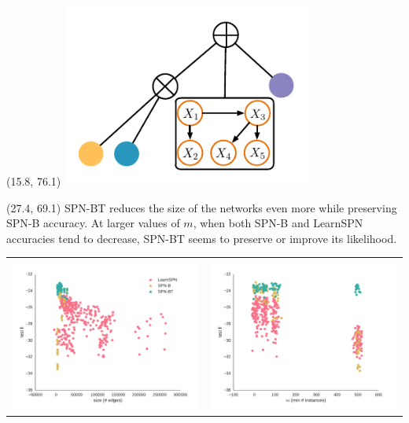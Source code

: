\documentclass[final]{beamer}
\begin{document}
\begin{frame}{}
  \begin{textblock}{10}(15.8, 76.1)
    \includegraphics[width=8.2cm]{figures/spn-clt}
    \end{textblock}
  
  \begin{textblock}{25.2}(27.4, 69.1)
    \footnotesize
    \textsf{SPN-BT} reduces the
    size of the networks even more while preserving \textsf{SPN-B}
    accuracy. At larger values of $m$, when both \textsf{SPN-B} and \textsf{LearnSPN}
    accuracies tend to decrease, \textsf{SPN-BT} seems to preserve or
    improve its likelihood.
    
    \begin{center}
      \begin{table}[ht]
        \setlength{\tabcolsep}{30pt}  
        \begin{tabular}{c c}
          \includegraphics[width=0.4\linewidth]{figures/ll-depth/10-8/pumsb-star-ll-depth}&\includegraphics[width=0.4\linewidth]{figures/ll-m/10-8/pumsb-star-ll-m}
        \end{tabular}
      \end{table}
    \end{center}


\end{textblock}
\end{frame}
\end{document}
